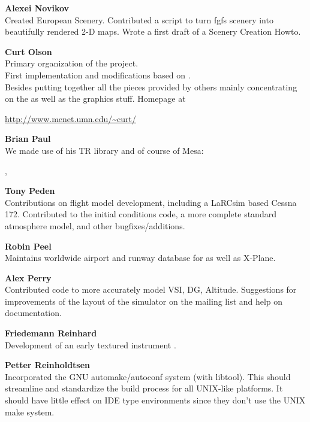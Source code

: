\noindent \textbf{Alexei Novikov}\\
  Created European Scenery. Contributed a script to turn fgfs scenery into beautifully rendered
  2-D maps. Wrote a first draft of a Scenery Creation Howto.
  \medskip

\noindent \textbf{Curt Olson}\\
 Primary organization of the project.\\
 First implementation and modifications based on .\\
 Besides putting together all the pieces provided by others mainly concentrating on the  as well as the graphics stuff. Homepage at

 \href{http://www.menet.umn.edu/~curt/}{http://www.menet.umn.edu/\~{}curt/}
 \medskip

\noindent \textbf{Brian Paul}\\
 We made use of his TR library and of course of Mesa:

 , 
 \medskip

\noindent \textbf{Tony Peden}\\
  Contributions on flight model development, including a LaRCsim based
  Cessna 172. Contributed to  {\JSBSim} the initial conditions code, a more complete
  standard atmosphere model, and other bugfixes/additions.
  \medskip


\noindent \textbf{Robin Peel}\\
  Maintains worldwide airport and runway database for \FlightGear{} as well as X-Plane.
 \medskip

\noindent \textbf{Alex Perry}\\
 Contributed code to more accurately model VSI, DG, Altitude.
 Suggestions for improvements of the layout of the simulator on the mailing list
 and help on documentation.
 \medskip

\noindent \textbf{Friedemann Reinhard}\\
  Development of an early textured instrument .
 \medskip

\noindent \textbf{Petter Reinholdtsen}\\
  Incorporated the GNU automake/autoconf system (with libtool).
  This should streamline and standardize the build process for all
  UNIX-like platforms.  It should have little effect on IDE type
  environments since they don't use the UNIX make system.
 \medskip

